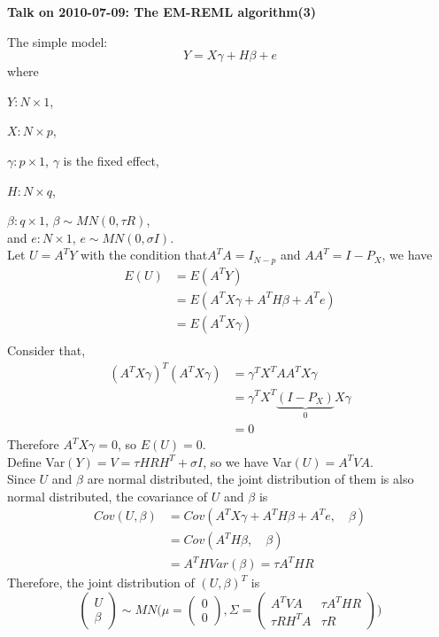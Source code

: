 \documentclass[12pt]{article}
\begin{document}
    \begin{center}
        {\bf Talk on 2010-07-09: The EM-REML algorithm(3)}
    \end{center}
    The simple model:
    \begin{equation*}
        Y=X\gamma+H\beta+e
    \end{equation*}
    where 
    
    $Y:N\times 1$,
    
    $X:N\times p$,
    
    $\gamma:p\times 1$, $\gamma$ is the fixed effect,
    
    $H:N\times q$,
    
    $\beta:q\times 1$, $\beta\sim MN(0,\tau R)$, \\    
    and $e:N\times1$, $e\sim MN(0,\sigma I)$.\\    
    Let $U=A^TY$ with the condition that$A^TA=I_{N-p}$ and $AA^T=I-P_X$, we have
    \begin{align*}
        E(U)&=E(A^TY)\\
        &=E(A^TX\gamma+A^TH\beta+A^Te)\\
        &=E(A^TX\gamma)\\
    \end{align*}
    Consider that,
    \begin{align*}
        (A^TX\gamma)^T(A^TX\gamma)&=\gamma^TX^TAA^TX\gamma\\
        &=\gamma^TX^T\underbrace{(I-P_X)}_{0}X\gamma\\
        &=0
    \end{align*}
    Therefore $A^TX\gamma=0$, so $E(U)=0$.\\
    Define Var$(Y)=V=\tau HRH^T+\sigma I$, so we have Var$(U)=A^TVA$.\\
    Since $U$ and $\beta$ are normal distributed, the joint distribution of them is also normal distributed, the covariance of $U$ and $\beta$ is
     \begin{equation*}
     \begin{split}
        Cov(U,\beta)&=Cov(A^TX\gamma+A^TH\beta+A^Te,\quad \beta)\\
        &=Cov(A^TH\beta,\quad \beta)\\
        &=A^THVar(\beta)=\tau A^THR
     \end{split}
    \end{equation*}
    Therefore, the joint distribution of $(U,\beta)^T$ is 
    \begin{equation*}
    \begin{pmatrix}
    U\\
    \beta
    \end{pmatrix}
    \sim MN\Big( \mu=\begin{pmatrix}
    0\\
    0
    \end{pmatrix}
    ,\Sigma=\begin{pmatrix}
    A^TVA&\tau A^THR\\
    \tau RH^TA&\tau R
    \end{pmatrix}
    \Big)
    \end{equation*}
\end{document}
